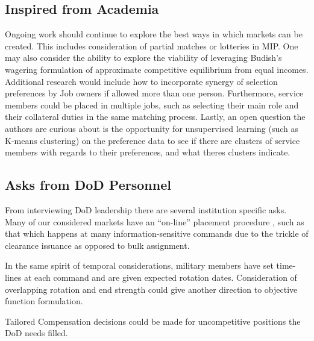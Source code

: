 \subsection{Inspired from Academia}

Ongoing work should continue to explore the best ways in which markets can be created. This includes consideration of partial matches or lotteries in MIP.\citep{1993_Roth} One may also consider the ability to explore the viability of leveraging Budish's wagering formulation of approximate competitive equilibrium from equal incomes.  \citep{2011_Budish} Additional research would include how to incorporate synergy of selection preferences by Job owners if allowed more than one person. \citep{1985_Roth_b}  Furthermore, service members could be placed in multiple jobs, such as selecting their main role and their collateral duties in the same matching process. \citep{1982_Roth} Lastly, an open question the authors are curious about is the opportunity for unsupervised learning (such as K-means clustering) on the preference data to see if there are clusters of service members with regards to their preferences, and what theres clusters indicate.

\subsection{Asks from DoD Personnel}

From interviewing DoD leadership there are several institution specific asks. Many of our considered markets have an “on-line” placement procedure \citep{1994_Khuller}, such as that which happens at many information-sensitive commands due to the trickle of clearance issuance as opposed to bulk assignment. 

In the same spirit of temporal considerations, military members have set time-lines at each command and are given expected rotation dates. Consideration of overlapping rotation and end strength could give another direction to objective function formulation.

Tailored Compensation decisions could be made for uncompetitive positions the DoD needs filled.

